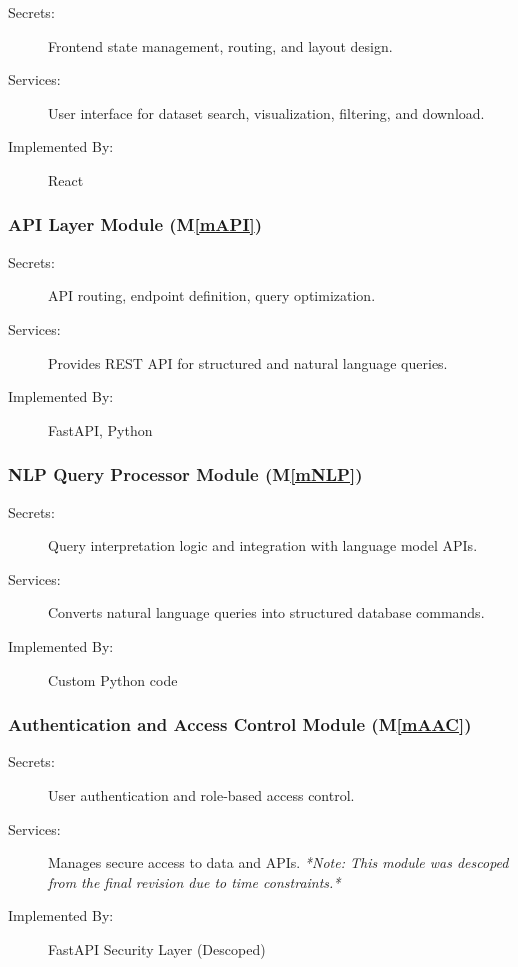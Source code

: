 \documentclass[12pt, titlepage]{article}
\newcommand{\mref}[1]{M\ref{#1}}
\begin{document}
\begin{description}
\item[Secrets:] Frontend state management, routing, and layout design.
\item[Services:] User interface for dataset search, visualization, filtering, and download.
\item[Implemented By:] React
\end{description}

\subsubsection{API Layer Module (\mref{mAPI})}

\begin{description}
\item[Secrets:] API routing, endpoint definition, query optimization.
\item[Services:] Provides REST API for structured and natural language queries.
\item[Implemented By:] FastAPI, Python
\end{description}

\subsubsection{NLP Query Processor Module (\mref{mNLP})}

\begin{description}
\item[Secrets:] Query interpretation logic and integration with language model APIs.
\item[Services:] Converts natural language queries into structured database commands.
\item[Implemented By:] Custom Python code
\end{description}

\subsubsection{Authentication and Access Control Module (\mref{mAAC})}

\begin{description}
\item[Secrets:] User authentication and role-based access control.
\item[Services:] Manages secure access to data and APIs. \textit{*Note: This module was descoped from the final revision due to time constraints.*}
\item[Implemented By:] FastAPI Security Layer (Descoped)
\end{description}
\end{document}
